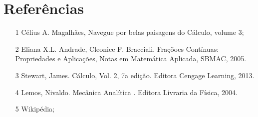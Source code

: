 \documentclass{article}
\begin{document}
\section{Referências}
\begin{enumerate}
    \item [1] Célius A. Magalhães, Navegue por belas paisagens do Cálculo, volume 3;
    \item [2] Eliana X.L. Andrade, Cleonice F. Bracciali. Fraçõoes Contínuas: Propriedades e Aplicações, Notas em Matemática Aplicada, SBMAC, 2005.
    \item [3] Stewart, James. Cálculo, Vol. 2, 7a edição. Editora Cengage Learning, 2013.
    \item [4] Lemos, Nivaldo. Mecânica Analítica . Editora Livraria da Física, 2004.
    \item [5] Wikipédia;
\end{enumerate}
\end{document}
